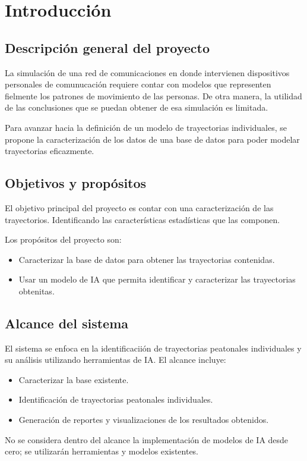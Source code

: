 	\section{Introducci\'on}
	\subsection{Descripci\'on general del proyecto}
	\noindent La simulaci\'on de una red de comunicaciones en donde intervienen dispositivos personales de comunucaci\'on requiere contar con modelos que representen fielmente los patrones de movimiento de las personas. De otra manera, la utilidad de las conclusiones que se puedan obtener de esa simulaci\'on es limitada. 

	\noindent Para avanzar hacia la definici\'on de un modelo de trayectorias individuales, se propone la caracterización de los datos de una base de datos para poder modelar trayectorias eficazmente. 
	
	\subsection{Objetivos y prop\'ositos}
	\noindent El objetivo principal del proyecto es contar con una caracterizaci\'on de las trayectorios. Identificando las caracter\'isticas estad\'isticas que las componen.

	\noindent Los prop\'ositos del proyecto son:
	\begin{itemize}
		\item Caracterizar la base de datos para obtener las trayectorias contenidas.
		\item Usar un modelo de IA que permita identificar y caracterizar las trayectorias obtenitas.
	\end{itemize}

	\subsection{Alcance del sistema}
	\noindent El sistema se enfoca en la identificaciión de trayectorias peatonales individuales y su an\'alisis utilizando herramientas de IA. El alcance incluye:
	\begin{itemize}
		\item Caracterizar la base existente.
		\item Identificación de trayectorias peatonales individuales.
		\item Generaci\'on de reportes y visualizaciones de los resultados obtenidos.
	\end{itemize}
	\noindent No se considera dentro del alcance la implementaci\'on de modelos de IA desde cero; se utilizar\'an herramientas y modelos existentes.